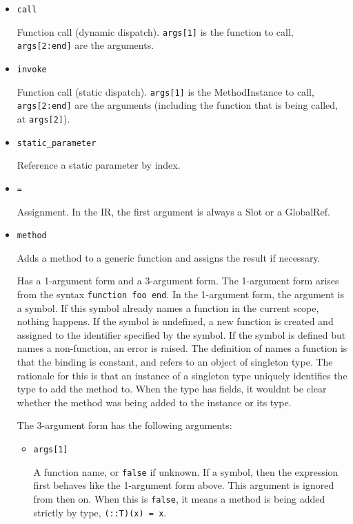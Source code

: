\begin{itemize}
\item \texttt{call}

Function call (dynamic dispatch). \texttt{args[1]} is the function to call, \texttt{args[2:end]} are the arguments.


\item \texttt{invoke}

Function call (static dispatch). \texttt{args[1]} is the MethodInstance to call, \texttt{args[2:end]} are the arguments (including the function that is being called, at \texttt{args[2]}).


\item \texttt{static\_parameter}

Reference a static parameter by index.


\item \texttt{=}

Assignment. In the IR, the first argument is always a Slot or a GlobalRef.


\item \texttt{method}

Adds a method to a generic function and assigns the result if necessary.

Has a 1-argument form and a 3-argument form. The 1-argument form arises from the syntax \texttt{function foo end}. In the 1-argument form, the argument is a symbol. If this symbol already names a function in the current scope, nothing happens. If the symbol is undefined, a new function is created and assigned to the identifier specified by the symbol. If the symbol is defined but names a non-function, an error is raised. The definition of {\textquotedbl}names a function{\textquotedbl} is that the binding is constant, and refers to an object of singleton type. The rationale for this is that an instance of a singleton type uniquely identifies the type to add the method to. When the type has fields, it wouldn{\textquotesingle}t be clear whether the method was being added to the instance or its type.

The 3-argument form has the following arguments:

\begin{itemize}
\item \texttt{args[1]}

A function name, or \texttt{false} if unknown. If a symbol, then the expression first behaves like the 1-argument form above. This argument is ignored from then on. When this is \texttt{false}, it means a method is being added strictly by type, \texttt{(::T)(x) = x}.



\end{itemize}
\end{itemize}
